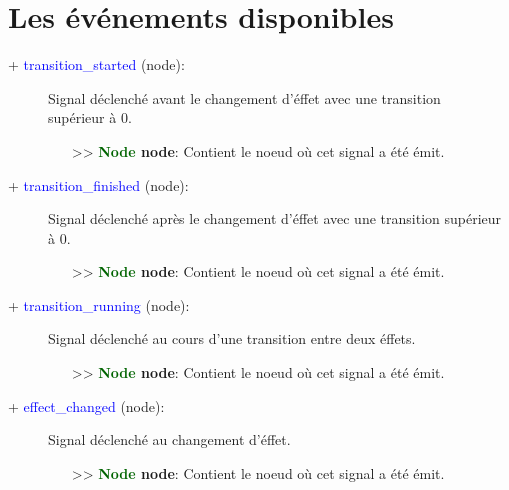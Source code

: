 \documentclass[a4paper, 11pt]{article}
\begin{document}
	\section{Les événements disponibles}
	\begin{description}
		\item [+ \textcolor{blue}{transition\_started} (node):] Signal déclenché avant le changement d'éffet 
		avec une transition \\supérieur à 0.
		\begin{itemize}
			\item [>> \textbf{\textcolor{darkgreen}{Node} node}:] Contient le noeud où cet signal a été 
			émit.\\
		\end{itemize}
	\end{description}
	\newpage \begin{description}
		\item [+ \textcolor{blue}{transition\_finished} (node):] Signal déclenché après le changement 
		d'éffet avec une transition supérieur à 0.
		\begin{itemize}
			\item [>> \textbf{\textcolor{darkgreen}{Node} node}:] Contient le noeud où cet signal a été 
			émit.\\
		\end{itemize}
	\end{description}
	\begin{description}
		\item [+ \textcolor{blue}{transition\_running} (node):] Signal déclenché au cours d'une transition
		entre deux éffets.
		\begin{itemize}
			\item [>> \textbf{\textcolor{darkgreen}{Node} node}:] Contient le noeud où cet signal a été 
			émit.\\
		\end{itemize}
	\end{description}
	\begin{description}
		\item [+ \textcolor{blue}{effect\_changed} (node):] Signal déclenché au changement d'éffet.
		\begin{itemize}
			\item [>> \textbf{\textcolor{darkgreen}{Node} node}:] Contient le noeud où cet signal a été 
			émit.\\
		\end{itemize}
	\end{description}
\end{document}
